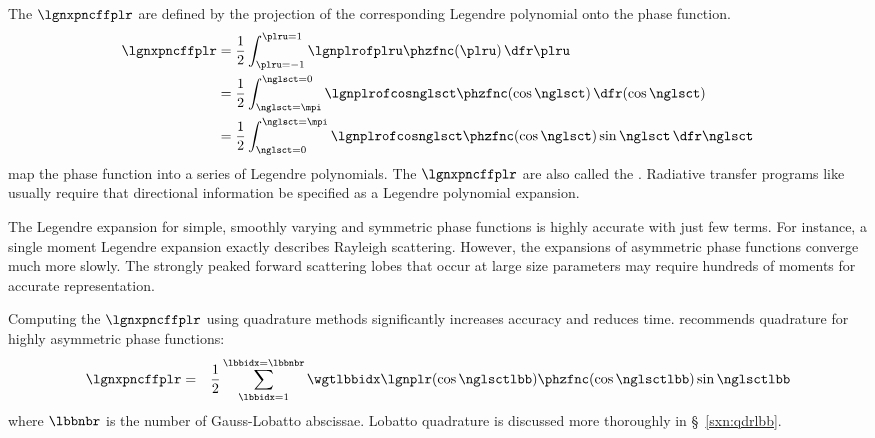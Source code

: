\documentclass[12pt]{article}
\begin{document}
The  $\lgnxpncffplr$ are defined
by the projection of the corresponding Legendre polynomial onto
the phase function.
\begin{subequations}
\label{eqn:lgn_xpn_cff}
\begin{align}
\lgnxpncffplr & =
\frac{1}{2}
\int_{\plru = -1}^{\plru = 1} 
\lgnplrofplru \phzfnc(\plru) \,\dfr\plru \\
& =
\frac{1}{2}
\int_{\nglsct = \mpi}^{\nglsct = 0} 
\lgnplrofcosnglsct \phzfnc(\cos\nglsct) \,\dfr(\cos\nglsct) \\
& =
\frac{1}{2}
\int_{\nglsct = 0}^{\nglsct = \mpi} 
\lgnplrofcosnglsct \phzfnc(\cos\nglsct) \sin\nglsct \,\dfr\nglsct
\end{align}
\end{subequations}
map the phase function into a series of Legendre polynomials.
The $\lgnxpncffplr$ are also called the 
.
Radiative transfer programs like  \citep{STW88}
usually require that directional information be specified as
a Legendre polynomial expansion.

The Legendre expansion for simple, smoothly varying and symmetric
phase functions is highly accurate with just few terms.
For instance, a single moment Legendre expansion exactly describes
Rayleigh scattering.
However, the expansions of asymmetric phase functions converge
much more slowly.
The strongly peaked forward scattering lobes that occur at
large size parameters may require hundreds of moments for accurate
representation.

Computing the $\lgnxpncffplr$ using quadrature methods significantly
increases accuracy and reduces time.
\citet{Wis771} recommends  quadrature for
highly asymmetric phase functions:
\begin{eqnarray}
\label{eqn:lgn_xpn_cff_lbb}
\lgnxpncffplr & = &
\frac{1}{2}
\sum_{\lbbidx = 1}^{\lbbidx = \lbbnbr} 
\wgtlbbidx \lgnplr(\cos\nglsctlbb) \phzfnc(\cos\nglsctlbb) \sin\nglsctlbb
\end{eqnarray}
where $\lbbnbr$ is the number of Gauss-Lobatto abscissae.
Lobatto quadrature is discussed more thoroughly in \S~\ref{sxn:qdrlbb}.
\end{document}
